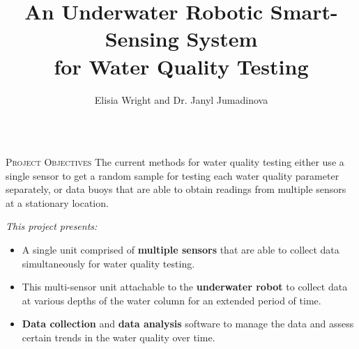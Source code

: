 \documentclass[final,t]{beamer}
\title[]{ An Underwater Robotic Smart-Sensing System \\ for Water Quality Testing }
\author[Wright]{Elisia Wright and Dr. Janyl Jumadinova}
\institute{Department of Computer Science, Allegheny College \\ Meadville, PA}
\begin{document}
    \begin{frame}{}
        \vspace*{-6mm}
        \begin{columns}[t]
        	\begin{column}{1\linewidth}

                \begin{alertblock}{\textsc{Project Objectives}}
                    \vspace*{6mm}
                    The current methods for water quality testing either use  a single 	
                    sensor to get a random sample for testing each water quality 											parameter separately, or data buoys that are able to obtain
                    readings from multiple sensors at a stationary location. 
                    \vspace{3mm}
                    
                    \emph{This project presents:}
                    \begin{itemize}
                        \item A single unit comprised of \textbf{multiple sensors} that are able to collect data simultaneously for water quality testing.
                        \item This multi-sensor unit attachable to the \textbf{underwater robot} to collect data at various depths of the water column for an extended period of time. 
                        \item \textbf{Data collection} and \textbf{data analysis} software to manage the data and assess certain trends in the water quality over time.
                    \end{itemize}
                    \vspace*{6mm}
                \end{alertblock}
			\end{column}
		\end{columns}
		
		

\end{frame}
\end{document}
